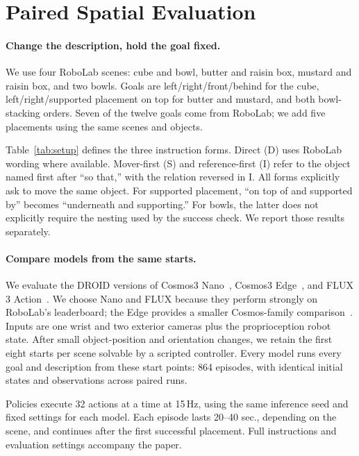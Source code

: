 \documentclass{article}
\begin{document}
\section{Paired Spatial Evaluation}
\paragraph{Change the description, hold the goal fixed.}
We use four RoboLab scenes: cube and bowl, butter and raisin box, mustard and raisin box, and two bowls. Goals are left/right/front/behind for the cube, left/right/supported placement on top for butter and mustard, and both bowl-stacking orders. Seven of the twelve goals come from RoboLab; we add five placements using the same scenes and objects.

Table~\ref{tab:setup} defines the three instruction forms. Direct (D) uses RoboLab wording where available. Mover-first (S) and reference-first (I) refer to the object named first after ``so that,'' with the relation reversed in I. All forms explicitly ask to move the same object. For supported placement, ``on top of and supported by'' becomes ``underneath and supporting.'' For bowls, the latter does not explicitly require the nesting used by the success check. We report those results separately.

\paragraph{Compare models from the same starts.}
We evaluate the DROID versions of Cosmos3 Nano~\citep{nvidia2026nano}, Cosmos3 Edge~\citep{nvidia2026edge}, and FLUX 3 Action~\citep{bfl2026fluxaction}. We choose Nano and FLUX because they perform strongly on RoboLab's leaderboard; the Edge provides a smaller Cosmos-family comparison~\citep{robolab2026leaderboard}. Inputs are one wrist and two exterior cameras plus the proprioception robot state. After small object-position and orientation changes, we retain the first eight starts per scene solvable by a scripted controller. Every model runs every goal and description from these start points: 864 episodes, with identical initial states and observations across paired runs.

Policies execute 32 actions at a time at 15\,Hz, using the same inference seed and fixed settings for each model. Each episode lasts 20--40 sec., depending on the scene, and continues after the first successful placement. Full instructions and evaluation settings accompany the paper.
\end{document}
